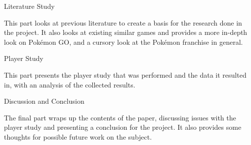 \documentclass[12pt, oneside]{Thesis} %
\makeatletter
\let\LaTeXStandardPart\part%
\newcommand{\unstarredpart@@noopt}[1]{%
	\unstarredpart@@opt[#1]{#1}%
}%
\newcommand{\unstarredpart@@opt}[2][]{%
	\cleardoublepage%
	\begingroup%
	\let\newpage\relax%
	\LaTeXStandardPart[#1]{#2}%
	\endgroup%
}%
\newcommand{\starredpart}[1]{%
	\LaTeXStandardPart*{#1}%
}%
\newcommand{\unstarredpart}{%
	\@ifnextchar[{\unstarredpart@@opt}{\unstarredpart@@noopt}%
}%
\renewcommand{\part}{%
	\@ifstar{\starredpart}{\unstarredpart}%
}%
\makeatother
\begin{document}
{\label{part:intro}


\part{Literature Study}
\begin{center}
	This part looks at previous literature to create a basis for the research done in the project. It also looks at existing similar games and provides a more in-depth look on Pokémon GO, and a cursory look at the Pokémon franchise in general.
\end{center}

\label{part:literature-study}
 

\part{Player Study}
\begin{center}
	This part presents the player study that was performed and the data it resulted in, with an analysis of the collected results.	
\end{center}

\label{part:player-study}




\part{Discussion and Conclusion}
\begin{center}
	The final part wraps up the contents of the paper, discussing issues with the player study and presenting a conclusion for the project. It also provides some thoughts for possible future work on the subject.
\end{center}

\label{part:discussion-and-conclusion}





\appendix %

}
\end{document}

